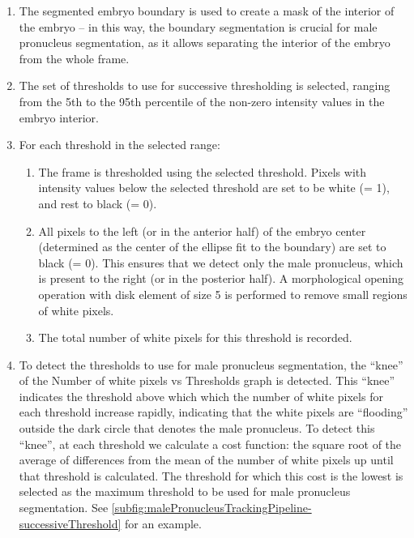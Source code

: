 \begin{enumerate}
    \item The segmented embryo boundary is used to create a mask of the interior of the embryo -- in this way, the boundary segmentation is crucial for male pronucleus segmentation, as it allows separating the interior of the embryo from the whole frame.
    \item The set of thresholds to use for successive thresholding is selected, ranging from the \num{5}th to the \num{95}th percentile of the non-zero intensity values in the embryo interior.
    \item For each threshold in the selected range:
    \begin{enumerate}
        \item The frame is thresholded using the selected threshold. Pixels with intensity values below the selected threshold are set to be white (= \num{1}), and rest to black (= \num{0}).
        \item All pixels to the left (or in the anterior half) of the embryo center (determined as the center of the ellipse fit to the boundary) are set to black (= \num{0}). This ensures that we detect only the male pronucleus, which is present to the right (or in the posterior half). A morphological opening operation with disk element of size \SI{5}{\pixels} is performed to remove small regions of white pixels.
        \item The total number of white pixels for this threshold is recorded.
    \end{enumerate}
    \item To detect the thresholds to use for male pronucleus segmentation, the \enquote{knee} of the Number of white pixels vs Thresholds graph is detected. This \enquote{knee} indicates the threshold above which which the number of white pixels for each threshold increase rapidly, indicating that the white pixels are \enquote{flooding} outside the dark circle that denotes the male pronucleus. To detect this \enquote{knee}, at each threshold we calculate a cost function: the square root of the average of differences from the mean of the number of white pixels up until that threshold is calculated. The threshold for which this cost is the lowest is selected as the maximum threshold to be used for male pronucleus segmentation. See \autoref{subfig:malePronucleusTrackingPipeline-successiveThreshold} for an example.

\end{enumerate}
